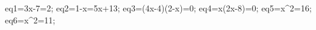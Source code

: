 \documentclass[exercice]{thedocument}%
\begin{document}
%
    \>eq1=3x-7=2;%
    \>eq2=1-x=5x+13;%
    \>eq3=(4x-4)(2-x)=0;%
    \>eq4=x(2x-8)=0;%
    \>eq5=x^2=16;%
    \>eq6=x^2=11;%
\end{document}

